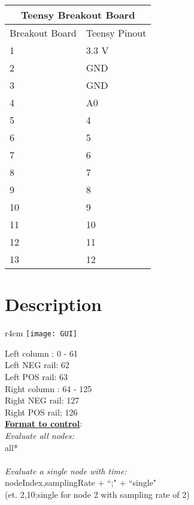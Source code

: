\documentclass{article}
\begin{document}
\begin{table}[h]
\begin{tabular}{|m{3.23cm}|m{3.23cm}|}
\hline
\multicolumn{2}{|c|}{Teensy Breakout Board} \\
\hline
Breakout Board  & Teensy Pinout \\
\hline
1 & 3.3 V \\
2 & GND \\
3 & GND \\
4 & A0 \\
5 & 4 \\
6 & 5 \\
7 & 6 \\
8 & 7 \\
9 & 8 \\
10 & 9 \\
11 & 10 \\
12 & 11 \\
13 & 12 \\
\hline
\end{tabular}
\end{table}

\section{Description}
\begin{wrapfigure}{r}{4cm}
    \centering
    \texttt{[image: GUI]}
\end{wrapfigure}
Left column  : 0 - 61 \\
Left NEG rail: 62 \\
Left POS rail: 63 \\
Right column  : 64 - 125 \\
Right NEG rail: 127 \\
Right POS rail; 126 \\[18pt]
\textbf{\underline{Format to control}}: \\
\textit{Evaluate all nodes:} \\
all* \\~\\
\textit{Evaluate a single node with time:} \\
nodeIndex,samplingRate + ``;" + ``single" \\
(et. 2,10;single for node 2 with sampling rate of 2)
\end{document}
